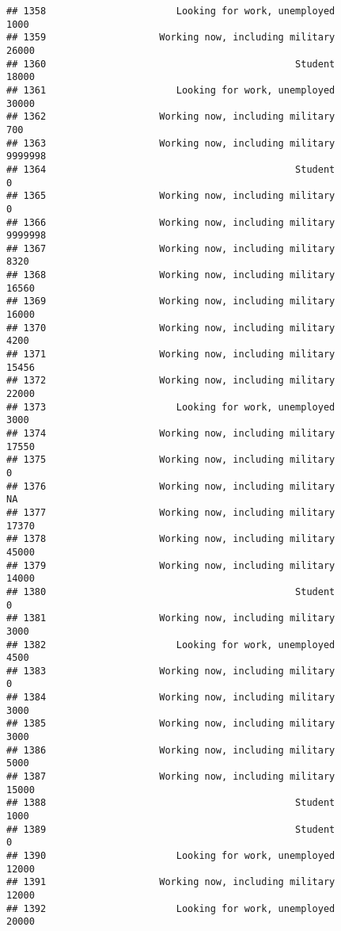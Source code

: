 \documentclass[]{book}
\theoremstyle{definition}
\theoremstyle{definition}
\theoremstyle{remark}
\begin{document}
\begin{verbatim}
## 1358                       Looking for work, unemployed            1000
## 1359                    Working now, including military           26000
## 1360                                            Student           18000
## 1361                       Looking for work, unemployed           30000
## 1362                    Working now, including military             700
## 1363                    Working now, including military         9999998
## 1364                                            Student               0
## 1365                    Working now, including military               0
## 1366                    Working now, including military         9999998
## 1367                    Working now, including military            8320
## 1368                    Working now, including military           16560
## 1369                    Working now, including military           16000
## 1370                    Working now, including military            4200
## 1371                    Working now, including military           15456
## 1372                    Working now, including military           22000
## 1373                       Looking for work, unemployed            3000
## 1374                    Working now, including military           17550
## 1375                    Working now, including military               0
## 1376                    Working now, including military              NA
## 1377                    Working now, including military           17370
## 1378                    Working now, including military           45000
## 1379                    Working now, including military           14000
## 1380                                            Student               0
## 1381                    Working now, including military            3000
## 1382                       Looking for work, unemployed            4500
## 1383                    Working now, including military               0
## 1384                    Working now, including military            3000
## 1385                    Working now, including military            3000
## 1386                    Working now, including military            5000
## 1387                    Working now, including military           15000
## 1388                                            Student            1000
## 1389                                            Student               0
## 1390                       Looking for work, unemployed           12000
## 1391                    Working now, including military           12000
## 1392                       Looking for work, unemployed           20000

\end{verbatim}
\end{document}
